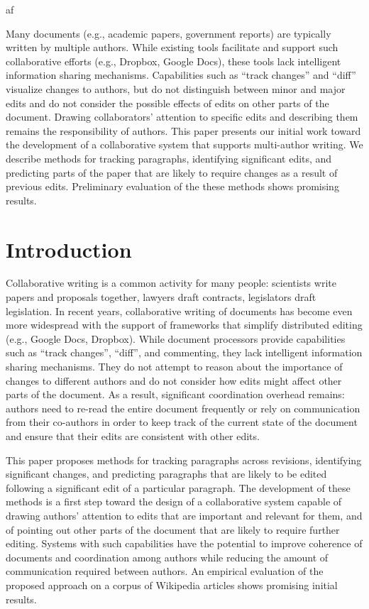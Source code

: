 af

Many documents (e.g., academic papers, government reports) are typically
written by multiple authors. While existing tools facilitate and support
such collaborative efforts (e.g., Dropbox, Google Docs), these tools
lack intelligent information sharing mechanisms. Capabilities such as
``track changes'' and ``diff'' visualize changes to authors, but do not
distinguish between minor and major edits and do not consider the
possible effects of edits on other parts of the document. Drawing
collaborators' attention to specific edits and describing them remains
the responsibility of authors. This paper presents our initial work
toward the development of a collaborative system that supports
multi-author writing. We describe methods for tracking paragraphs,
identifying significant edits, and predicting parts of the paper that
are likely to require changes as a result of previous edits. Preliminary
evaluation of the these methods shows promising results.

\section{Introduction}\label{introduction}

Collaborative writing is a common activity for many people: scientists
write papers and proposals together, lawyers draft contracts,
legislators draft legislation. In recent years, collaborative writing of
documents has become even more widespread with the support of frameworks
that simplify distributed editing (e.g., Google Docs, Dropbox). While
document processors provide capabilities such as ``track changes'',
``diff'', and commenting, they lack intelligent information sharing
mechanisms. They do not attempt to reason about the importance of
changes to different authors and do not consider how edits might affect
other parts of the document. As a result, significant coordination
overhead remains: authors need to re-read the entire document frequently
or rely on communication from their co-authors in order to keep track of
the current state of the document and ensure that their edits are
consistent with other edits.

This paper proposes methods for tracking paragraphs across revisions,
identifying significant changes, and predicting paragraphs that are
likely to be edited following a significant edit of a particular
paragraph. The development of these methods is a first step toward the
design of a collaborative system capable of drawing authors' attention
to edits that are important and relevant for them, and of pointing out
other parts of the document that are likely to require further editing.
Systems with such capabilities have the potential to improve coherence
of documents and coordination among authors while reducing the amount of
communication required between authors. An empirical evaluation of the
proposed approach on a corpus of Wikipedia articles shows promising
initial results.

